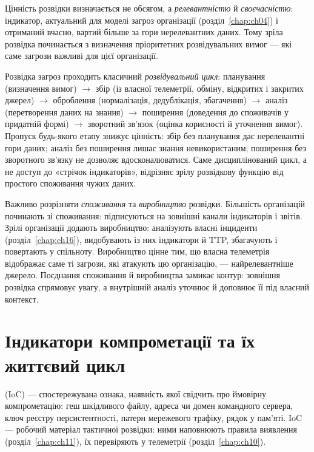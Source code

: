 Цінність розвідки визначається не обсягом, а \emph{релевантністю} й \emph{своєчасністю}: індикатор, актуальний для моделі загроз організації (розділ~\ref{chap:ch04}) і отриманий вчасно, вартий більше за гори нерелевантних даних. Тому зріла розвідка починається з визначення пріоритетних розвідувальних вимог --- які саме загрози важливі для цієї організації.

Розвідка загроз проходить класичний \emph{розвідувальний цикл}: планування (визначення вимог) $\to$ збір (із власної телеметрії, обміну, відкритих і закритих джерел) $\to$ оброблення (нормалізація, дедублікація, збагачення) $\to$ аналіз (перетворення даних на знання) $\to$ поширення (доведення до споживачів у придатній формі) $\to$ зворотний зв'язок (оцінка корисності й уточнення вимог). Пропуск будь-якого етапу знижує цінність: збір без планування дає нерелевантні гори даних; аналіз без поширення лишає знання невикористаним; поширення без зворотного зв'язку не дозволяє вдосконалюватися. Саме дисциплінований цикл, а не доступ до «стрічок індикаторів», відрізняє зрілу розвідкову функцію від простого споживання чужих даних.

Важливо розрізняти \emph{споживання} та \emph{виробництво} розвідки. Більшість організацій починають зі споживання: підписуються на зовнішні канали індикаторів і звітів. Зрілі організації додають виробництво: аналізують власні інциденти (розділ~\ref{chap:ch16}), видобувають із них індикатори й TTP, збагачують і повертають у спільноту. Виробництво цінне тим, що власна телеметрія відображає саме ті загрози, які атакують цю організацію, --- найрелевантніше джерело. Поєднання споживання й виробництва замикає контур: зовнішня розвідка спрямовує увагу, а внутрішній аналіз уточнює й доповнює її під власний контекст.

\section{Індикатори компрометації та їх життєвий цикл}\label{sec:ch12-ioc}

 (IoC) --- спостережувана ознака, наявність якої свідчить про ймовірну компрометацію: геш шкідливого файлу, адреса чи домен командного сервера, ключ реєстру персистентності, патерн мережевого трафіку, рядок у пам'яті. IoC --- робочий матеріал тактичної розвідки: ними наповнюють правила виявлення (розділ~\ref{chap:ch11}), їх перевіряють у телеметрії (розділ~\ref{chap:ch10}).

\begin{tikzfig}
\end{tikzfig}


